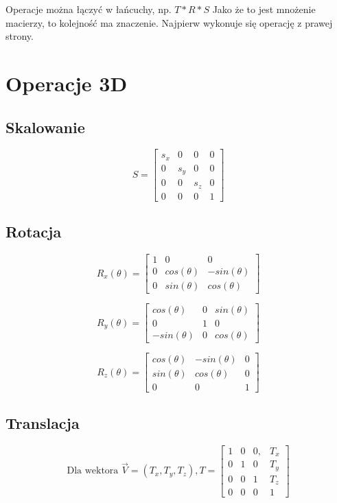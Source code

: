 \documentclass{../notatki}
\begin{document}
Operacje można łączyć w łańcuchy, np. $T * R * S$
Jako że to jest mnożenie macierzy, to kolejność ma znaczenie.
Najpierw wykonuje się operację z prawej strony.

\section{Operacje 3D}

\subsection{Skalowanie}

$$
S = \begin{bmatrix} s_x & 0 & 0 & 0 \\ 0 & s_y & 0 & 0 \\ 0 & 0 & s_z & 0 \\ 0 & 0 & 0 & 1 \end{bmatrix}
$$

\subsection{Rotacja}

$$
R_x(\theta) = 
\begin{bmatrix}
    1 & 0 & 0 \\
    0 & cos(\theta) & -sin(\theta) \\
    0 & sin(\theta) & cos(\theta) 
\end{bmatrix}
$$

$$
R_y(\theta) = 
\begin{bmatrix}
    cos(\theta) & 0 & sin(\theta) \\
    0 & 1 & 0 \\
    -sin(\theta) & 0 & cos(\theta) 
\end{bmatrix}
$$

$$
R_z(\theta) = 
\begin{bmatrix}
    cos(\theta) & -sin(\theta) & 0 \\
    sin(\theta) & cos(\theta) & 0 \\
    0 & 0 & 1
\end{bmatrix}
$$

\subsection{Translacja}

$$
\text{Dla wektora }
\vec{V}=(T_x, T_y, T_z),
T=
\begin{bmatrix} 1 & 0 & 0, & T_x \\ 0 & 1 & 0 & T_y \\ 0 & 0 & 1 & T_z \\ 0 & 0 & 0 & 1 \end{bmatrix}
$$
\end{document}
